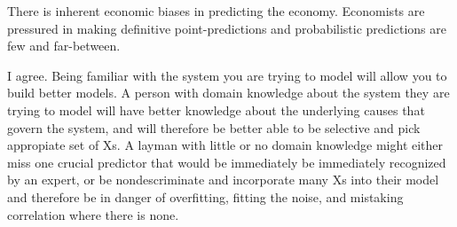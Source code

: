 \documentclass[12pt]{article}
\begin{document}
\begin{enumerate}

There is inherent economic biases in predicting the economy. Economists are pressured in making definitive point-predictions and probabilistic predictions are few and far-between.



I agree. Being familiar with the system you are trying to model will allow you to build better models. A person with domain knowledge about the system they are trying to model will have better knowledge about the underlying causes that govern the system, and will therefore be better able to be selective and pick appropiate set of Xs. A layman with little or no domain knowledge might either miss one crucial predictor that would be immediately be immediately recognized by an expert, or be nondescriminate and incorporate many Xs into their model and therefore be in danger of overfitting, fitting the noise, and mistaking correlation where there is none.


\end{enumerate}


\end{document}
